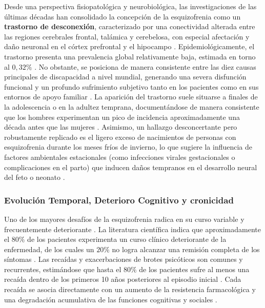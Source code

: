 \documentclass[12pt,a4paper,onecolumn,oneside]{report}
\begin{document}
Desde una perspectiva fisiopatológica y neurobiológica, las investigaciones de las últimas décadas han consolidado la concepción de la esquizofrenia como un \textbf{trastorno de desconexión}, caracterizado por una conectividad alterada entre las regiones cerebrales frontal, talámica y cerebelosa, con especial afectación y daño neuronal en el córtex prefrontal y el hipocampo \cite{montano2013esquizofrenia, schizonet2023}. Epidemiológicamente, el trastorno presenta una prevalencia global relativamente baja, estimada en torno al $0,32\%$ \cite{saboori2025predictive}. No obstante, se posiciona de manera consistente entre las diez causas principales de discapacidad a nivel mundial, generando una severa disfunción funcional y un profundo sufrimiento subjetivo tanto en los pacientes como en sus entornos de apoyo familiar \cite{saboori2025predictive}. La aparición del trastorno suele situarse a finales de la adolescencia o en la adultez temprana, documentándose de manera consistente que los hombres experimentan un pico de incidencia aproximadamente una década antes que las mujeres \cite{schizonet2023}. Asimismo, un hallazgo desconcertante pero robustamente replicado es el ligero exceso de nacimientos de personas con esquizofrenia durante los meses fríos de invierno, lo que sugiere la influencia de factores ambientales estacionales (como infecciones virales gestacionales o complicaciones en el parto) que inducen daños tempranos en el desarrollo neural del feto o neonato \cite{schizonet2023}.

\subsubsection{Evolución Temporal, Deterioro Cognitivo y cronicidad}

Uno de los mayores desafíos de la esquizofrenia radica en su curso variable y frecuentemente deteriorante \cite{montano2013esquizofrenia}. La literatura científica indica que aproximadamente el $80\%$ de los pacientes experimenta un curso clínico deteriorante de la enfermedad, de los cuales un $20\%$ no logra alcanzar una remisión completa de los síntomas \cite{montano2013esquizofrenia}. Las recaídas y exacerbaciones de brotes psicóticos son comunes y recurrentes, estimándose que hasta el $80\%$ de los pacientes sufre al menos una recaída dentro de los primeros 10 años posteriores al episodio inicial \cite{saboori2025predictive}. Cada recaída se asocia directamente con un aumento de la resistencia farmacológica y una degradación acumulativa de las funciones cognitivas y sociales \cite{saboori2025predictive, montano2013esquizofrenia}.
\end{document}
